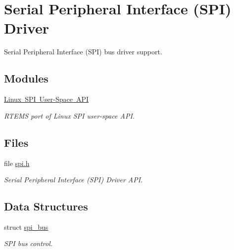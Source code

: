 \hypertarget{group__SPI}{}\section{Serial Peripheral Interface (S\+PI) Driver}
\label{group__SPI}


Serial Peripheral Interface (S\+PI) bus driver support.  


\subsection*{Modules}
\begin{DoxyCompactItemize}
\item 
\mbox{\hyperlink{group__SPILinux}{Linux S\+P\+I User-\/\+Space A\+PI}}
\begin{DoxyCompactList}\small\item\em R\+T\+E\+MS port of Linux S\+PI user-\/space A\+PI. \end{DoxyCompactList}\end{DoxyCompactItemize}
\subsection*{Files}
\begin{DoxyCompactItemize}
\item 
file \mbox{\hyperlink{cpukit_2include_2dev_2spi_2spi_8h}{spi.\+h}}
\begin{DoxyCompactList}\small\item\em Serial Peripheral Interface (S\+PI) Driver A\+PI. \end{DoxyCompactList}\end{DoxyCompactItemize}
\subsection*{Data Structures}
\begin{DoxyCompactItemize}
\item 
struct \mbox{\hyperlink{structspi__bus}{spi\+\_\+bus}}
\begin{DoxyCompactList}\small\item\em S\+PI bus control. \end{DoxyCompactList}\end{DoxyCompactItemize}
